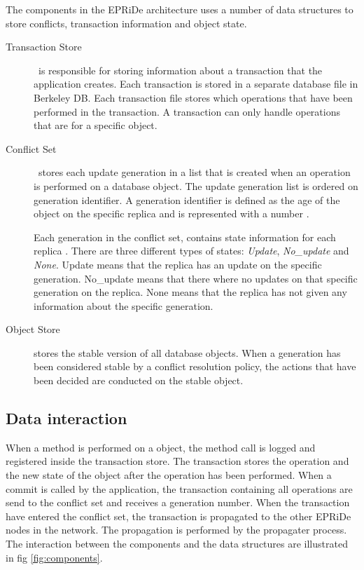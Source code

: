 The components in the EPRiDe architecture uses a number of data structures to store conflicts, transaction information and object state. 
\begin{description}
	
	\item[Transaction Store] \
	is responsible for storing information about a transaction that the application creates. Each transaction is stored in a separate database file in Berkeley DB.  Each transaction file stores which operations that have been performed in the transaction. A transaction can only handle operations that are for a specific object.
	
	\item[Conflict Set] \
	stores each update generation in a list that is created when an operation is performed on a database object. The update generation list is ordered on generation identifier. A generation identifier is defined as the age of the object on the specific replica and is represented with a number \cite[]{Syber2007}.
	
	Each generation in the conflict set, contains state information for each replica \cite[]{Syber2007}. There are three different types of states: \emph{Update}, \emph{No\_update} and \emph{None}. Update means that the replica has an update on the specific generation. No\_update means that there where no updates on that specific generation on the replica. None means that the replica has not given any information about the specific generation. 
	
	\item[Object Store] stores the stable version of all database objects. When a generation has been considered stable by a conflict resolution policy, the actions that have been decided are conducted on the stable object.
	
\end{description}
     

\subsection{Data interaction} %
\label{sub:data_interaction}

When a method is performed on a object, the method call is logged and registered inside the transaction store. The transaction stores the operation and the new state of the object after the operation has been performed. When a commit is called by the application, the transaction containing all operations are send to the conflict set and receives a generation number. When the transaction have entered the conflict set, the transaction is propagated to the other EPRiDe nodes in the network. The propagation is performed by the propagater process. The interaction between the components and the data structures are illustrated in fig \ref{fig:components}.

